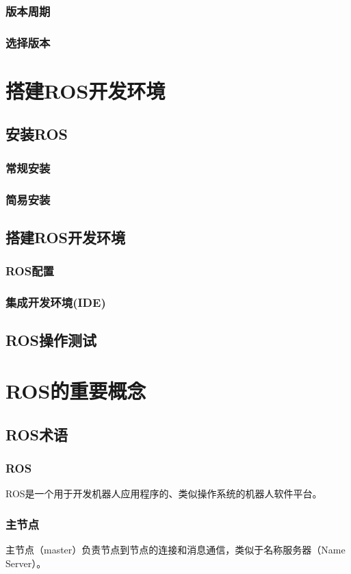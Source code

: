 \documentclass[geye,green,kindle,cn]{elegantnote}
\begin{document}
\subsubsection{版本周期}
\subsubsection{选择版本}
\section{搭建ROS开发环境}
\subsection{安装ROS}
\subsubsection{常规安装}
\subsubsection{简易安装}
\subsection{搭建ROS开发环境}
\subsubsection{ROS配置}
\subsubsection{集成开发环境(IDE)}
\subsection{ROS操作测试}
\section{ROS的重要概念}
\subsection{ROS术语}
\subsubsection{ROS}
ROS是一个用于开发机器人应用程序的、类似操作系统的机器人软件平台。
\subsubsection{主节点}
主节点（master）负责节点到节点的连接和消息通信，类似于名称服务器（Name Server）。
\end{document}
